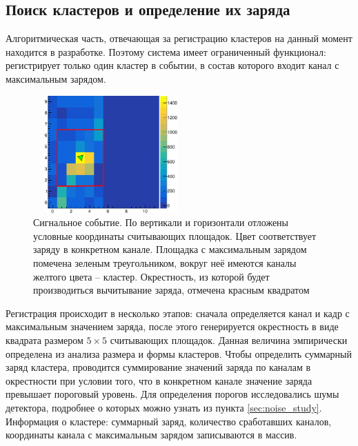  \subsection{Поиск кластеров и определение их заряда}
 Алгоритмическая часть, отвечающая за регистрацию кластеров на данный момент  находится в разработке. Поэтому система имеет ограниченный функционал: регистрирует только один кластер в событии, в состав которого входит канал с максимальным зарядом. 
 \begin{figure}[h]
 	\begin{center}
 		\includegraphics[width = 6cm, height = 4.5cm]{img/cluster_padmap.pdf}
 		\caption{Сигнальное событие. По вертикали и горизонтали отложены условные координаты считывающих площадок. Цвет соответствует заряду в конкретном канале. Площадка с максимальным зарядом помечена зеленым треугольником, вокруг неё имеются каналы желтого цвета -- кластер. Окрестность, из которой будет производиться вычитывание заряда, отмечена красным квадратом}
 		\label{fig:cluster_padmap}
 	\end{center}
 \end{figure}
 Регистрация происходит в несколько этапов: сначала определяется канал и кадр с максимальным значением заряда, после этого генерируется окрестность в виде квадрата размером $5\times5$ считывающих площадок. Данная величина эмпирически определена из анализа размера и формы кластеров. Чтобы определить суммарный заряд кластера, проводится суммирование значений заряда по каналам в окрестности при условии того, что в конкретном канале значение заряда превышает пороговый уровень. Для определения порогов исследовались шумы детектора, подробнее о которых можно узнать из пункта \ref{sec:noise_study}. Информация о кластере: суммарный заряд, количество сработавших каналов, координаты канала с максимальным зарядом записываются в массив. 
 
 
 
